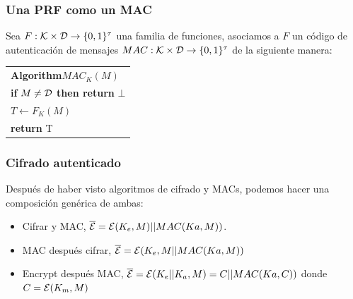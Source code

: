 \documentclass{beamer}
\newcommand{\binStr}{\{0,1\}}
\newcommand{\tab}{\hspace{0.5cm}}
\begin{document}

\frame
{
\frametitle{Una PRF como un MAC}

Sea $F:{\cal K} \times {\cal D} \rightarrow \binStr^{\tau}$ una familia de funciones, asociamos a $F$ un código de autenticación de mensajes $MAC:{\cal K} \times {\cal D} \rightarrow \binStr^{\tau}$ de la siguiente manera:\\
\vspace{1 cm}
\begin{tabular}{l}
\textbf{Algorithm}$MAC_K(M)$\\
\tab \textbf{if} $M \neq {\cal D}$ \textbf{then return} $\bot$\\
\tab$T\leftarrow F_K(M)$\\
\tab\textbf{return} T
\end{tabular}

}

\frame
{
	\frametitle{Cifrado autenticado}
	
	Después de haber visto algoritmos de cifrado y MACs, podemos hacer una composición genérica de ambas:\\	
	
	\begin{itemize}
	\item Cifrar y MAC, $\overline{{\cal E}}={\cal E}(K_e,M)||MAC(Ka,M))$. \\
	\item MAC después cifrar, $\overline{{\cal E}}={\cal E}(K_e,M||MAC(Ka,M))$\\
	\item Encrypt después MAC, $\overline{{\cal E}}={\cal E}(K_e||K_a,M)=C||MAC(Ka,C))$ donde $C={\cal E}(K_m,M)$\\
	\end{itemize}

}
\end{document}
